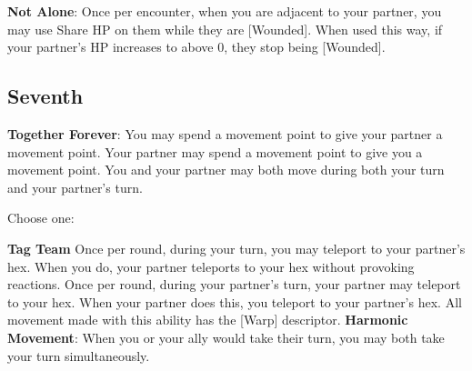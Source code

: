 \begin{multicols*}{2}
\textbf{Not Alone}: Once per encounter, when you are adjacent to your partner, you may use Share HP on them while they are [Wounded]. When used this way, if your partner's HP increases to above 0, they stop being [Wounded].

\subsection*{Seventh \Facet\perk}
\textbf{Together Forever}: You may spend a movement point to give your partner a movement point. Your partner may spend a movement point to give you a movement point. You and your partner may both move during both your turn and your partner's turn.

Choose one:
\begin{itemize}
\thing \textbf{Tag Team} Once per round, during your turn, you may teleport to your partner's hex. When you do, your partner teleports to your hex without provoking reactions. Once per round, during your partner's turn, your partner may teleport to your hex. When your partner does this, you teleport to your partner's hex. All movement made with this ability has the [Warp] descriptor.
\thing \textbf{Harmonic Movement}: When you or your ally would take their turn, you may both take your turn simultaneously.
\end{itemize}
\end{multicols*}

